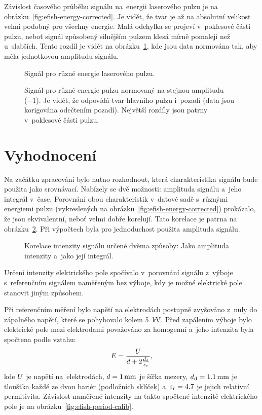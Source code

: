 Závislost časového průběhu signálu \EFISH{} na~energii laserového pulzu
je na obrázku~\ref{fig:efish-energy-corrected}.
Je vidět, že tvar je až na absolutní velikost velmi podobný pro všechny
energie.
Malá odchylka se projeví v~poklesové části pulzu, neboť signál způsobený
silnějším pulzem klesá mírně pomaleji než u~slabších.
Tento rozdíl je vidět na obrázku~\ref{fig:efish-energy-norm},
kde jsou data normována tak, aby měla jednotkovou amplitudu signálu.

\begin{figure}[htp]
	\centering
	
	\caption{Signál \EFISH{} pro různé energie laserového pulzu.}
	\label{fig:efish-energy-corrected}
	\vspace{24pt}
	
	\caption{Signál \EFISH{} pro různé energie pulzu normovaný na stejnou
		amplitudu (\num{-1}).
		Je vidět, že odpovídá tvar hlavního pulzu i~pozadí
		(data jsou korigována odečtením pozadí).
		Největší rozdíly jsou patrny v~poklesové části pulzu.}
	\label{fig:efish-energy-norm}
\end{figure}

\section{Vyhodnocení}
\label{sec:efish-method}
Na začátku zpracování bylo nutno rozhodnout, která charakteristika signálu
\EFISH{} bude použita jako srovnávací.
Nabízely se dvě možnosti: amplituda signálu a~jeho integrál v~čase.
Porovnání obou charakteristik v~datové sadě s~různými energiemi pulzu
(vykreslených na obrázku~\ref{fig:efish-energy-corrected}) prokázalo,
že jsou ekvivalentní, neboť velmi dobře korelují.
Tato korelace je patrna na obrázku~\ref{fig:efish-intmax}.
Při výpočtech byla pro jednoduchost použita amplituda signálu.

\begin{figure}[htp]
	\centering
	
	\caption{Korelace intenzity signálu \EFISH{} určené dvěma způsoby:
		Jako amplituda intenzity a~jako její integrál.}
	\label{fig:efish-intmax}
\end{figure}

Určení intenzity elektrického pole spočívalo v~porovnání signálu
\EFISH{} z~výboje s~referenčním signálem naměřeným bez výboje,
kdy je možné elektrické pole stanovit jiným způsobem.

Při referenčním měření bylo napětí na elektrodách postupně zvyšováno
z~nuly do zápalného napětí, které se pohybovalo kolem \SI{5}{\kilo\volt}.
Před zapálením výboje bylo elektrické pole mezi elektrodami považováno
za homogenní a~jeho intenzita byla spočtena podle vztahu:
\begin{equation}
	E = \frac{U}
		{d + 2\frac{d_\text{d}}{\varepsilon_\text{r}}},
\end{equation}
kde $U$ je napětí na~elektrodách,
$d = \SI{1}{\milli\metre}$ je šířka mezery,
$d_\text{d} = \SI{1.1}{\milli\metre}$ je tloušťka každé ze dvou bariér
(podložních sklíček)
a~$\varepsilon_\text{r} = \num{4.7}$ je jejich relativní permitivita.
Závislost naměřené intenzity na takto spočtené intenzitě elektrického
pole je na obrázku~\ref{fig:efish-period-calib}.

